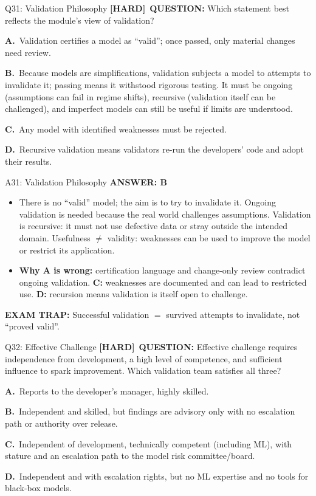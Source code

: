 \documentclass[8pt]{beamer}
\newcommand{\fs}{\fontsize{10}{12}\selectfont}
\newcommand{\opts}[4]{\par\vspace{0.12cm}\noindent\textbf{A.}~#1\par\vspace{0.08cm}\noindent\textbf{B.}~#2\par\vspace{0.08cm}\noindent\textbf{C.}~#3\par\vspace{0.08cm}\noindent\textbf{D.}~#4\par}
\newcommand{\ans}[1]{\textcolor{myblue}{\textbf{ANSWER: #1}}}
\newcommand{\trap}[1]{\textcolor{myred}{\textbf{EXAM TRAP:}} #1}
\newcommand{\hard}{\textcolor{myorange}{\textbf{[HARD]}}}
\begin{document}
\begin{frame}[t]{Q31: Validation Philosophy}
\fs
\hard\ \textbf{QUESTION:} Which statement best reflects the module's view of validation?
\opts{Validation certifies a model as ``valid''; once passed, only material changes need review.}
{Because models are simplifications, validation subjects a model to attempts to invalidate it; passing means it withstood rigorous testing. It must be ongoing (assumptions can fail in regime shifts), recursive (validation itself can be challenged), and imperfect models can still be useful if limits are understood.}
{Any model with identified weaknesses must be rejected.}
{Recursive validation means validators re-run the developers' code and adopt their results.}
\end{frame}

\begin{frame}[t]{A31: Validation Philosophy}
\fs
\ans{B}
\begin{itemize}
\item There is no ``valid'' model; the aim is to try to invalidate it. Ongoing validation is needed because the real world challenges assumptions. Validation is recursive: it must not use defective data or stray outside the intended domain. Usefulness $\ne$ validity: weaknesses can be used to improve the model or restrict its application.
\item \textbf{Why A is wrong:} certification language and change-only review contradict ongoing validation. \textbf{C:} weaknesses are documented and can lead to restricted use. \textbf{D:} recursion means validation is itself open to challenge.
\end{itemize}
\trap{Successful validation $=$ \textcolor{myblue}{survived attempts to invalidate}, not ``proved valid''.}
\end{frame}

\begin{frame}[t]{Q32: Effective Challenge}
\fs
\hard\ \textbf{QUESTION:} Effective challenge requires independence from development, a high level of competence, and sufficient influence to spark improvement. Which validation team satisfies all three?
\opts{Reports to the developer's manager, highly skilled.}
{Independent and skilled, but findings are advisory only with no escalation path or authority over release.}
{Independent of development, technically competent (including ML), with stature and an escalation path to the model risk committee/board.}
{Independent and with escalation rights, but no ML expertise and no tools for black-box models.}
\end{frame}
\end{document}
